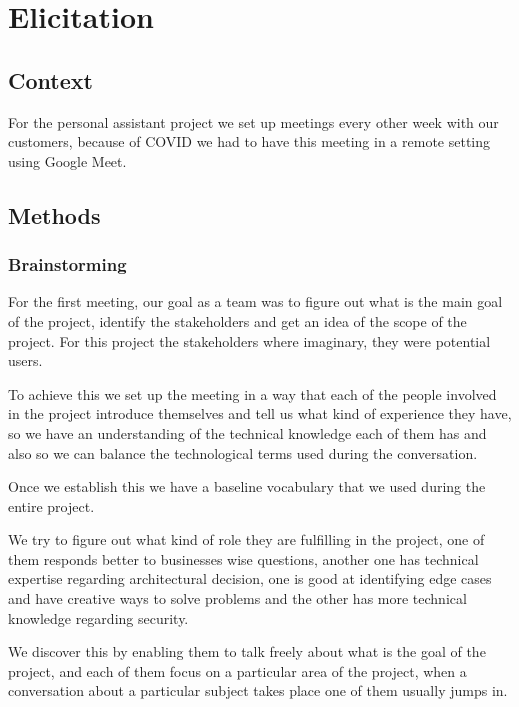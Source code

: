 \section{Elicitation}
\subsection{Context}
For the personal assistant project we set up meetings every other week with 
our customers, because of COVID we had to have this meeting in a remote 
setting using Google Meet.

\subsection{Methods}
\subsubsection{Brainstorming}
For the first meeting, our goal as a team was to figure out what is the main 
goal of the project, identify the stakeholders and get an idea of the scope of 
the project. For this project the stakeholders where imaginary, they were 
potential users.  \linebreak

\noindent To achieve this we set up the meeting in a way that each of the 
people involved in the project introduce themselves and tell us what kind of 
experience they have, so we have an understanding of the technical knowledge 
each of them has and also so we can balance the technological terms used 
during the conversation. \begin{flushleft} Once we establish this we have a baseline vocabulary that we used 
during the entire project.\end{flushleft} 

\noindent We try to figure out what kind of role they are fulfilling in the 
project, one of them responds better to businesses wise questions, another one 
has technical expertise regarding architectural decision, one is good at 
identifying edge cases and have creative ways to solve problems and the other 
has more technical knowledge regarding security. \linebreak

\noindent We discover this by enabling them to talk freely about what is the 
goal of the project, and each of them focus on a particular area of the 
project, when a conversation about a particular subject takes place one of 
them usually jumps in. \linebreak

